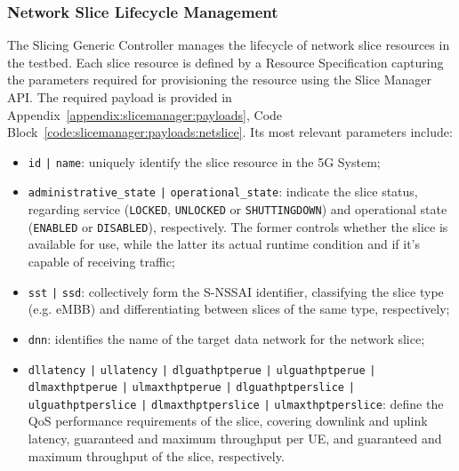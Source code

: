 
\subsubsection{Network Slice Lifecycle Management}

The Slicing Generic Controller manages the lifecycle of network slice resources in the testbed. Each slice resource is defined by a Resource Specification capturing the parameters required for provisioning the resource using the Slice Manager \acs{API}. The required payload is provided in Appendix~\ref{appendix:slicemanager:payloads}, Code Block~\ref{code:slicemanager:payloads:netslice}. Its most relevant parameters include:

\begin{itemize}
    \item \texttt{id} \texttt{|} \texttt{name}: uniquely identify the slice resource in the \acs{5G} System;
    \item \texttt{administrative\_state} \texttt{|} \texttt{operational\_state}: indicate the slice status, regarding service (\texttt{LOCKED}, \texttt{UNLOCKED} or \texttt{SHUTTINGDOWN}) and operational state (\texttt{ENABLED} or \texttt{DISABLED}), respectively. The former controls whether the slice is available for use, while the latter its actual runtime condition and if it's capable of receiving traffic;
    \item \texttt{sst} \texttt{|} \texttt{ssd}: collectively form the \acs{S-NSSAI} identifier, classifying the slice type (e.g. \acs{eMBB}) and differentiating between slices of the same type, respectively;
    \item \texttt{dnn}: identifies the name of the target data network for the network slice;
    \item \texttt{dllatency} \texttt{|} \texttt{ullatency} \texttt{|} \texttt{dlguathptperue} \texttt{|} \texttt{ulguathptperue} \texttt{|} \texttt{dlmaxthpt\-perue} \texttt{|} \texttt{ulmaxthptperue} \texttt{|} \texttt{dlguathptperslice} \texttt{|} \texttt{ulguathptperslice} \texttt{|} \texttt{dl\-maxthptperslice} \texttt{|} \texttt{ulmaxthptperslice}: define the \acs{QoS} performance requirements of the slice, covering downlink and uplink latency, guaranteed and maximum throughput per \acs{UE}, and guaranteed and maximum throughput of the slice, respectively.
\end{itemize}

